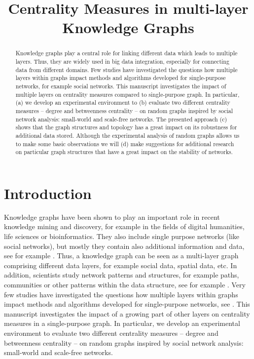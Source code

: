 \title{Centrality Measures in multi-layer Knowledge Graphs}



\maketitle              %

\begin{abstract}
Knowledge graphs play a central role for linking different data which leads to multiple layers. Thus, they are widely used in big data integration, especially for connecting data from different domains. Few studies have investigated the questions how multiple layers within graphs impact methods and algorithms developed for single-purpose networks, for example social networks. This manuscript investigates the impact of multiple layers on centrality measures compared to single-purpose graph. In particular, (a) we develop an experimental environment to (b) evaluate two different centrality measures – degree and betweenness centrality -- on random graphs inspired by social network analysis: small-world and scale-free networks. The presented approach (c) shows that the graph structures and topology has a great impact on its robustness for additional data stored. Although the experimental analysis of random graphs allows us to make some basic observations we will (d) make suggestions for additional research on particular graph structures that have a great impact on the stability of networks.
\end{abstract}

\section{Introduction}

Knowledge graphs have been shown to play an important role in recent knowledge mining and discovery, for example in the fields of digital humanities, life sciences or bioinformatics. They also include single purpose networks (like social networks), but mostly they contain also additional information and data, see for example \cite{suarez2021risks,berhan2019board,rollinger2014amicitia}. Thus, a knowledge graph can be seen as a multi-layer graph comprising different data layers, for example social data, spatial data, etc. In addition, scientists study network patterns and structures, for example paths, communities or other patterns within the data structure, see for example \cite{dorpinghaus2019knowledge}. Very few studies have investigated the questions how multiple layers within graphs impact methods and algorithms developed for single-purpose networks, see \cite{rossetti2021conformity}. This manuscript investigates the impact of a growing part of other layers on centrality measures in a single-purpose graph. In particular, we develop an experimental environment to evaluate two different centrality measures -- degree and betweenness centrality -- on random graphs inspired by social network analysis: small-world and scale-free networks. 

